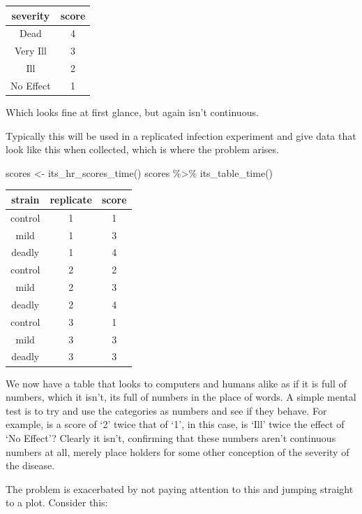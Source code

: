 \documentclass[
]{book}
\newenvironment{Shaded}{\begin{snugshade}}{\end{snugshade}}
\newcommand{\FunctionTok}[1]{\textcolor[rgb]{0.00,0.00,0.00}{#1}}
\newcommand{\NormalTok}[1]{#1}
\newcommand{\OtherTok}[1]{\textcolor[rgb]{0.56,0.35,0.01}{#1}}
\newcommand{\SpecialCharTok}[1]{\textcolor[rgb]{0.00,0.00,0.00}{#1}}
\begin{document}
\begin{tabular}{c|c}
\hline
severity & score\\
\hline
Dead & 4\\
\hline
Very Ill & 3\\
\hline
Ill & 2\\
\hline
No Effect & 1\\
\hline
\end{tabular}

Which looks fine at first glance, but again isn't continuous.

Typically this will be used in a replicated infection experiment and give data that look like this when collected, which is where the problem arises.

\begin{Shaded}
\begin{Highlighting}[]
\NormalTok{scores }\OtherTok{\textless{}{-}} \FunctionTok{its\_hr\_scores\_time}\NormalTok{()}
\NormalTok{scores }\SpecialCharTok{\%\textgreater{}\%} \FunctionTok{its\_table\_time}\NormalTok{()}
\end{Highlighting}
\end{Shaded}

\begin{tabular}{c|c|c}
\hline
strain & replicate & score\\
\hline
control & 1 & 1\\
\hline
mild & 1 & 3\\
\hline
deadly & 1 & 4\\
\hline
control & 2 & 2\\
\hline
mild & 2 & 3\\
\hline
deadly & 2 & 4\\
\hline
control & 3 & 1\\
\hline
mild & 3 & 3\\
\hline
deadly & 3 & 3\\
\hline
\end{tabular}

We now have a table that looks to computers and humans alike as if it is full of numbers, which it isn't, its full of numbers in the place of words. A simple mental test is to try and use the categories as numbers and see if they behave. For example, is a score of `2' twice that of `1', in this case, is `Ill' twice the effect of `No Effect'? Clearly it isn't, confirming that these numbers aren't continuous numbers at all, merely place holders for some other conception of the severity of the disease.

The problem is exacerbated by not paying attention to this and jumping straight to a plot. Consider this:
\end{document}
